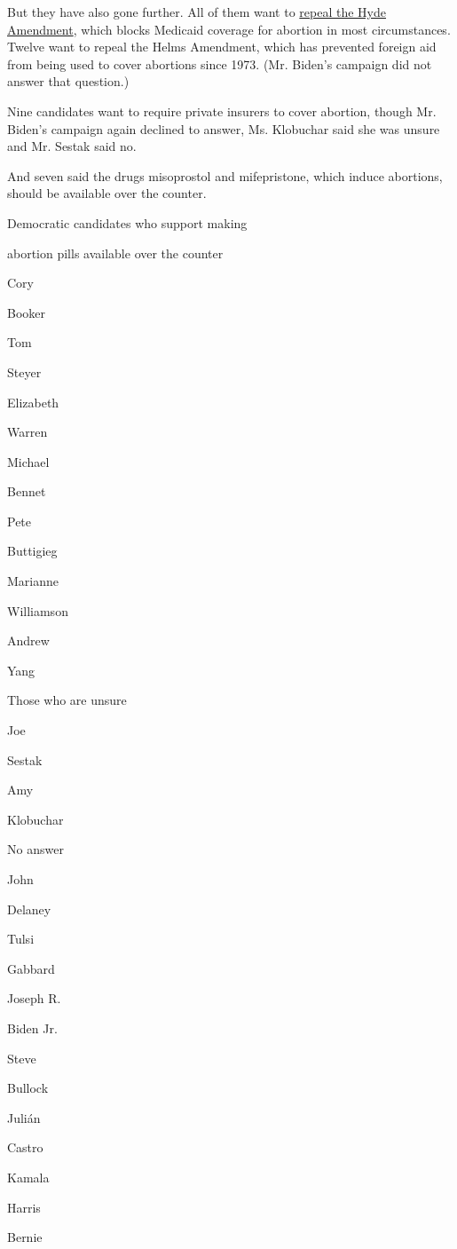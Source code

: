But they have also gone further. All of them want to
\href{https://www.nytimes3xbfgragh.onion/2019/06/07/us/politics/what-is-the-hyde-amendment.html}{repeal
the Hyde Amendment}, which blocks Medicaid coverage for abortion in most
circumstances. Twelve want to repeal the Helms Amendment, which has
prevented foreign aid from being used to cover abortions since 1973.
(Mr. Biden's campaign did not answer that question.)

Nine candidates want to require private insurers to cover abortion,
though Mr. Biden's campaign again declined to answer, Ms. Klobuchar said
she was unsure and Mr. Sestak said no.

And seven said the drugs misoprostol and mifepristone, which induce
abortions, should be available over the counter.

Democratic candidates who support making

abortion pills available over the counter

Cory

Booker

Tom

Steyer

Elizabeth

Warren

Michael

Bennet

Pete

Buttigieg

Marianne

Williamson

Andrew

Yang

Those who are unsure

Joe

Sestak

Amy

Klobuchar

No answer

John

Delaney

Tulsi

Gabbard

Joseph R.

Biden Jr.

Steve

Bullock

Julián

Castro

Kamala

Harris

Bernie

